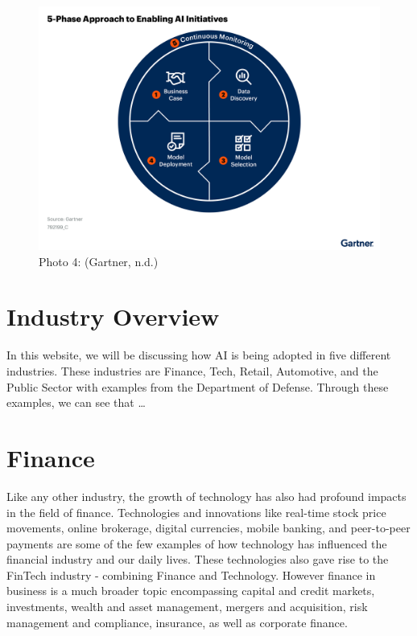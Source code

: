 \documentclass[
]{article}
\begin{document}
\begin{figure}
\centering
\includegraphics{gartnermodel.png}
\caption{Photo 4: (Gartner, n.d.)}
\end{figure}

\hypertarget{industry-overview}{%
\section{Industry Overview}\label{industry-overview}}

In this website, we will be discussing how AI is being adopted in five different industries. These industries are Finance, Tech, Retail, Automotive, and the Public Sector with examples from the Department of Defense. Through these examples, we can see that \ldots{}

\hypertarget{finance}{%
\section{Finance}\label{finance}}

Like any other industry, the growth of technology has also had profound impacts in the field of finance. Technologies and innovations like real-time stock price movements, online brokerage, digital currencies, mobile banking, and peer-to-peer payments are some of the few examples of how technology has influenced the financial industry and our daily lives. These technologies also gave rise to the FinTech industry - combining Finance and Technology. However finance in business is a much broader topic encompassing capital and credit markets, investments, wealth and asset management, mergers and acquisition, risk management and compliance, insurance, as well as corporate finance.
\end{document}
